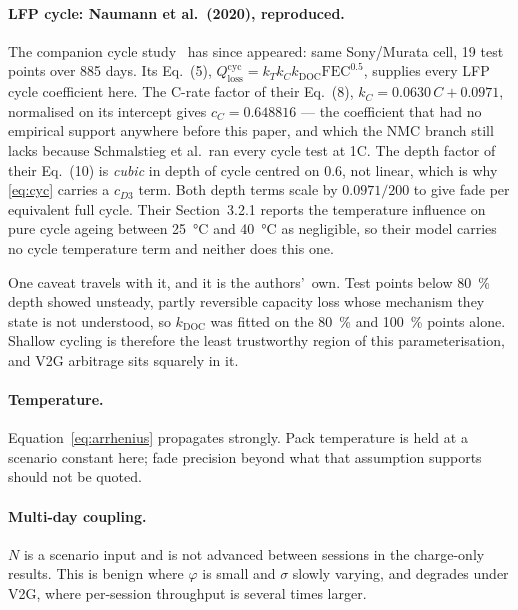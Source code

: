 \documentclass[11pt,a4paper]{article}
\begin{document}
\paragraph{LFP cycle: Naumann et al.\ (2020), reproduced.}
The companion cycle study~\cite{naumann2020} has since appeared: same
Sony/Murata cell, 19 test points over 885 days. Its Eq.~(5),
$Q^{\mathrm{cyc}}_{\mathrm{loss}} = k_T k_{C} k_{\mathrm{DOC}}
\mathrm{FEC}^{0.5}$, supplies every LFP cycle coefficient here. The
C-rate factor of their Eq.~(8), $k_C = 0.0630\,C + 0.0971$, normalised
on its intercept gives $c_C = \num{0.648816}$ --- the coefficient that
had no empirical support anywhere before this paper, and which the NMC
branch still lacks because Schmalstieg et al.\ ran every cycle test at
1C. The depth factor of their Eq.~(10) is \emph{cubic} in depth of
cycle centred on \num{0.6}, not linear, which is why \eqref{eq:cyc}
carries a $c_{D3}$ term. Both depth terms scale by $0.0971/200$ to give
fade per equivalent full cycle. Their Section~3.2.1 reports the
temperature influence on pure cycle ageing between \SI{25}{\celsius}
and \SI{40}{\celsius} as negligible, so their model carries no cycle
temperature term and neither does this one.

One caveat travels with it, and it is the authors'\ own. Test points
below \SI{80}{\percent} depth showed unsteady, partly reversible
capacity loss whose mechanism they state is not understood, so
$k_{\mathrm{DOC}}$ was fitted on the \SI{80}{\percent} and
\SI{100}{\percent} points alone. Shallow cycling is therefore the
least trustworthy region of this parameterisation, and V2G arbitrage
sits squarely in it.

\paragraph{Temperature.}
Equation~\eqref{eq:arrhenius} propagates strongly. Pack temperature is
held at a scenario constant here; fade precision beyond what that
assumption supports should not be quoted.

\paragraph{Multi-day coupling.}
$N$ is a scenario input and is not advanced between sessions in the
charge-only results. This is benign where $\varphi$ is small and
$\sigma$ slowly varying, and degrades under V2G, where per-session
throughput is several times larger.
\end{document}
